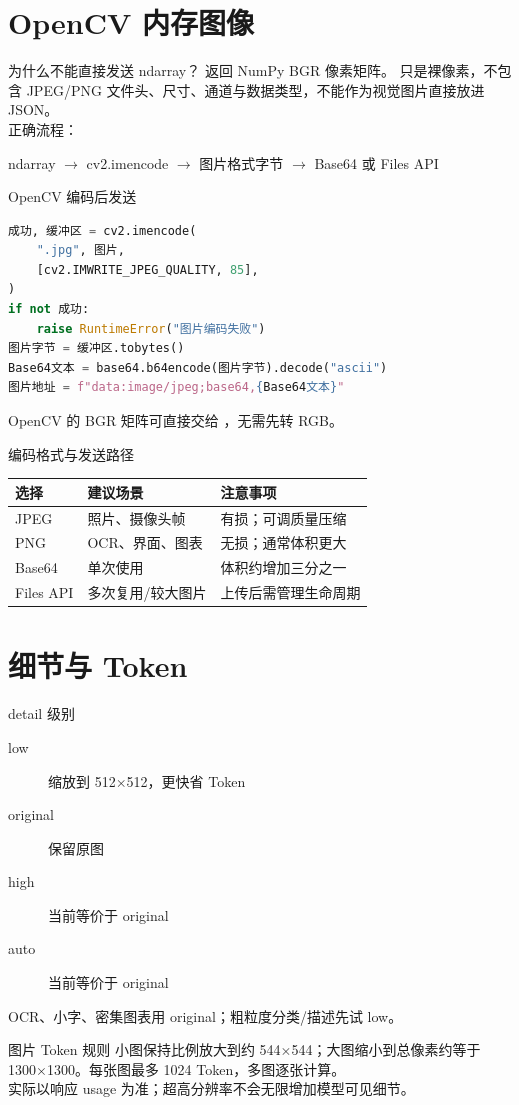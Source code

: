 \documentclass[aspectratio=169,UTF8]{ctexbeamer}
\begin{document}
\section{OpenCV 内存图像}
\begin{frame}{为什么不能直接发送 ndarray？}
 返回 NumPy BGR 像素矩阵。 只是裸像素，不包含 JPEG/PNG 文件头、尺寸、通道与数据类型，不能作为视觉图片直接放进 JSON。\\[8pt]
正确流程：
\begin{center}
ndarray $\rightarrow$ cv2.imencode $\rightarrow$ 图片格式字节 $\rightarrow$ Base64 或 Files API
\end{center}
\end{frame}
\begin{frame}[fragile]{OpenCV 编码后发送}
\begin{lstlisting}[language=Python]
成功, 缓冲区 = cv2.imencode(
    ".jpg", 图片,
    [cv2.IMWRITE_JPEG_QUALITY, 85],
)
if not 成功:
    raise RuntimeError("图片编码失败")
图片字节 = 缓冲区.tobytes()
Base64文本 = base64.b64encode(图片字节).decode("ascii")
图片地址 = f"data:image/jpeg;base64,{Base64文本}"
\end{lstlisting}
OpenCV 的 BGR 矩阵可直接交给 ，无需先转 RGB。
\end{frame}
\begin{frame}{编码格式与发送路径}
\begin{tabular}{lll}
\toprule
选择 & 建议场景 & 注意事项\\
\midrule
JPEG & 照片、摄像头帧 & 有损；可调质量压缩\\
PNG & OCR、界面、图表 & 无损；通常体积更大\\
Base64 & 单次使用 & 体积约增加三分之一\\
Files API & 多次复用/较大图片 & 上传后需管理生命周期\\
\bottomrule
\end{tabular}
\end{frame}
\section{细节与 Token}
\begin{frame}{detail 级别}
\begin{description}
  \item[low] 缩放到 512$\times$512，更快省 Token
  \item[original] 保留原图
  \item[high] 当前等价于 original
  \item[auto] 当前等价于 original
\end{description}
OCR、小字、密集图表用 original；粗粒度分类/描述先试 low。
\end{frame}
\begin{frame}{图片 Token 规则}
小图保持比例放大到约 544$\times$544；大图缩小到总像素约等于 1300$\times$1300。每张图最多 1024 Token，多图逐张计算。\\[8pt]
实际以响应 usage 为准；超高分辨率不会无限增加模型可见细节。
\end{frame}
\end{document}
